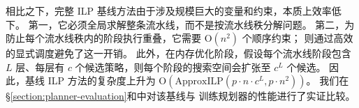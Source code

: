 相比之下，完整 ILP 基线方法由于涉及规模巨大的变量和约束，本质上效率低下。
第一，它必须全局求解整条流水线，而不是按流水线秩分解问题。
第二，为防止每个流水线秩内的阶段执行重叠，它需要 $\mathrm O(n^2)$ 个顺序约束；{\sys} 则通过高效的显式调度避免了这一开销。
此外，在内存优化阶段，假设每个流水线阶段包含 $L$ 层、每层有 $c$ 个候选策略，则每个阶段的搜索空间会扩张至 $c^L$ 个候选。
因此，基线 ILP 方法的复杂度上升为 $\mathrm O(\mathrm{ApproxILP}(p \cdot n \cdot c^L,p \cdot n^2))$。
我们在\S\ref{section:planner-evaluation}和中对该基线与 {\sys} 训练规划器的性能进行了实证比较。
